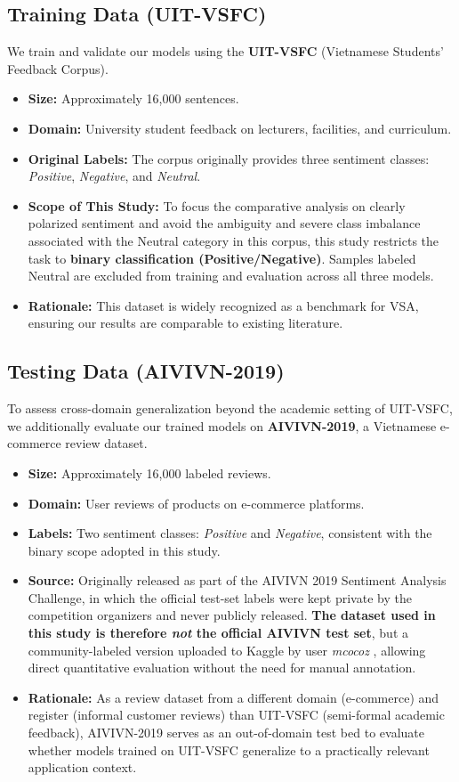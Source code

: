 \documentclass[12pt]{report} %
\begin{document}
\subsection{Training Data (UIT-VSFC)}
We train and validate our models using the \textbf{UIT-VSFC} (Vietnamese Students' Feedback Corpus).
\begin{itemize}
    \item \textbf{Size:} Approximately 16,000 sentences.
    \item \textbf{Domain:} University student feedback on lecturers, facilities, and curriculum.
    \item \textbf{Original Labels:} The corpus originally provides three sentiment classes: \textit{Positive}, \textit{Negative}, and \textit{Neutral}.
    \item \textbf{Scope of This Study:} To focus the comparative analysis on clearly polarized sentiment and avoid the ambiguity and severe class imbalance associated with the Neutral category in this corpus, this study restricts the task to \textbf{binary classification (Positive/Negative)}. Samples labeled Neutral are excluded from training and evaluation across all three models.
    \item \textbf{Rationale:} This dataset is widely recognized as a benchmark for VSA, ensuring our results are comparable to existing literature.
\end{itemize}

\subsection{Testing Data (AIVIVN-2019)}
To assess cross-domain generalization beyond the academic setting of UIT-VSFC, we additionally evaluate our trained models on \textbf{AIVIVN-2019}, a Vietnamese e-commerce review dataset.
\begin{itemize}
    \item \textbf{Size:} Approximately 16,000 labeled reviews.
    \item \textbf{Domain:} User reviews of products on e-commerce platforms.
    \item \textbf{Labels:} Two sentiment classes: \textit{Positive} and \textit{Negative}, consistent with the binary scope adopted in this study.
    \item \textbf{Source:} Originally released as part of the AIVIVN 2019 Sentiment Analysis Challenge, in which the official test-set labels were kept private by the competition organizers and never publicly released. \textbf{The dataset used in this study is therefore \emph{not} the official AIVIVN test set}, but a community-labeled version uploaded to Kaggle by user \textit{mcocoz} \cite{aivivn2019kaggle}, allowing direct quantitative evaluation without the need for manual annotation.
    \item \textbf{Rationale:} As a review dataset from a different domain (e-commerce) and register (informal customer reviews) than UIT-VSFC (semi-formal academic feedback), AIVIVN-2019 serves as an out-of-domain test bed to evaluate whether models trained on UIT-VSFC generalize to a practically relevant application context.
\end{itemize}
\end{document}
